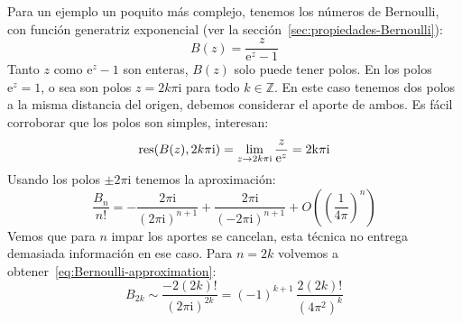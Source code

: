   Para un ejemplo un poquito más complejo,
  tenemos los números de Bernoulli,%
  con función generatriz exponencial
  (ver la sección~\ref{sec:propiedades-Bernoulli}):
  \begin{equation}
    \label{eq:ae:B(0,z)}
    B(z)
      = \frac{z}{\mathrm{e}^z - 1}
  \end{equation}
  Tanto \(z\) como \(\mathrm{e}^z - 1\) son enteras,
  \(B(z)\) solo puede tener polos.
  En los polos \(\mathrm{e}^z = 1\),
  o sea son polos \(z = 2 k \pi \mathrm{i}\)
  para todo \(k \in \mathbb{Z}\).
  En este caso tenemos dos polos a la misma distancia del origen,
  debemos considerar el aporte de ambos.
  Es fácil corroborar que los polos son simples,
  interesan:
  \begin{equation}
    \label{eq:residues-B(z)}
    \operatorname{res}(B(z), 2 k \pi \mathrm{i})
      = \lim_{z \rightarrow 2 k \pi \mathrm{i}}
	  \frac{z}{\mathrm{e}^z}
      = \mathrm{2 k \pi \mathrm{i}}
  \end{equation}
  Usando los polos \(\pm 2 \pi \mathrm{i}\)
  tenemos la aproximación:%
  \begin{equation}
    \label{eq:ae:Bn-1}
    \frac{B_n}{n!}
      = - \frac{2 \pi \mathrm{i}}{(2 \pi \mathrm{i})^{n + 1}}
	    + \frac{2 \pi \mathrm{i}}{(- 2 \pi \mathrm{i})^{n + 1}}
	    + O \left( \left( \frac{1}{4 \pi} \right)^n \right)
  \end{equation}
  Vemos que para \(n\) impar los aportes se cancelan,
  esta técnica no entrega demasiada información en ese caso.
  Para \(n = 2 k\)
  volvemos a obtener~\eqref{eq:Bernoulli-approximation}:
  \begin{equation}
    \label{eq:ae:Bernoulli-approximation}
    B_{2 k}
      \sim \frac{- 2 (2 k)!}{(2 \pi \mathrm{i})^{2 k}}
      = (-1)^{k + 1} \, \frac{2 (2 k)!}{(4 \pi^2)^k}
  \end{equation}
